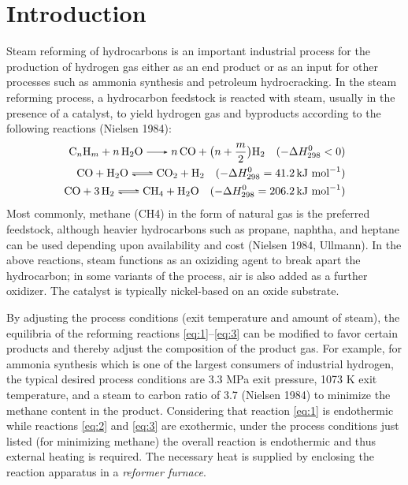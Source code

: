 \chapter{Introduction} \label{ch:introduction}

Steam reforming of hydrocarbons is an important industrial process for the production of hydrogen gas either as an end product or as an input for other processes such as ammonia synthesis and petroleum hydrocracking. In the steam reforming process, a hydrocarbon feedstock is reacted with steam, usually in the presence of a catalyst, to yield hydrogen gas and byproducts according to the following reactions (Nielsen 1984):
\begin{align}
\ce{C_{n}H_{m} + n H2O -> n CO + } \bigl(n + \frac{m}{2}\bigr) \ce{H2} \quad (-\Delta{}H^{0}_{298} < 0) \label{eq:1}\\
\ce{CO + H2O <=> CO2 + H2} \quad (-\Delta{}H^{0}_{298} = 41.2 \, \text{kJ mol}^{-1}) \label{eq:2}\\
\ce{CO + 3H2 <=> CH4 + H2O} \quad (-\Delta{}H^{0}_{298} = 206.2 \, \text{kJ mol}^{-1}) \label{eq:3}
\end{align}
Most commonly, methane (CH4) in the form of natural gas is the preferred feedstock, although heavier hydrocarbons such as propane, naphtha, and heptane can be used depending upon availability and cost (Nielsen 1984, Ullmann). In the above reactions, steam functions as an oxiziding agent to break apart the hydrocarbon; in some variants of the process, air is also added as a further oxidizer. The catalyst is typically nickel-based on an oxide substrate.

By adjusting the process conditions (exit temperature and amount of steam), the equilibria of the reforming reactions \ref{eq:1}--\ref{eq:3} can be modified to favor certain products and thereby adjust the composition of the product gas. For example, for ammonia synthesis which is one of the largest consumers of industrial hydrogen, the typical desired process conditions are 3.3 MPa exit pressure, 1073 K exit temperature, and a steam to carbon ratio of 3.7 (Nielsen 1984) to minimize the methane content in the product. Considering that reaction \ref{eq:1} is endothermic while reactions \ref{eq:2} and \ref{eq:3} are exothermic, under the process conditions just listed (for minimizing methane) the overall reaction is endothermic and thus external heating is required. The necessary heat is supplied by enclosing the reaction apparatus in a \emph{reformer furnace}.

